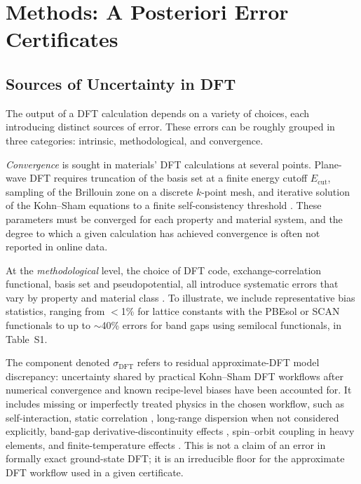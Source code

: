 \documentclass[twocolumn,superscriptaddress,amsmath,amssymb,longbibliography]{revtex4-2}
\newcommand{\Ecut}{E_{\mathrm{cut}}}
\begin{document}
\section{Methods: A Posteriori Error Certificates}
\label{sec:methods}

\subsection{Sources of Uncertainty in DFT}
\label{sec:bg_sources}

The output of a DFT calculation \cite{Hohenberg1964,KohnSham1965} depends on
a variety of choices, each introducing distinct sources of error. These errors can be roughly grouped in three categories: intrinsic, methodological, and convergence.

 \emph{Convergence} is sought in materials' DFT calculations at several points. Plane-wave DFT requires truncation of the
basis set at a finite energy cutoff $\Ecut$, sampling of the Brillouin zone
on a discrete $k$-point mesh, and iterative solution of the Kohn--Sham
equations to a finite self-consistency threshold
\cite{Kresse1996_VASP,Giannozzi2009_QE,Blum2009_FHIaims}. These parameters must be converged for each property and material system,
and the degree to which a given calculation has achieved convergence is often
not reported in online data.

At the \emph{methodological} level, the choice of DFT code, exchange-correlation
functional, basis set and pseudopotential, all introduce systematic errors that vary by property and material class
\cite{Perdew2001_Jacobs_Ladder,Mardirossian2017,Medvedev2017,Sun2015_SCAN,Furness2020_r2SCAN}. To illustrate, we include representative bias statistics, ranging from $<$1\% for
lattice constants with the PBEsol or SCAN functionals to up to  $\sim$40\% errors for band gaps using
semilocal functionals, in Table~S1.

The component denoted $\sigma_{\mathrm{DFT}}$ refers to residual approximate-DFT model discrepancy: uncertainty shared by practical Kohn--Sham DFT workflows after numerical convergence and known recipe-level biases have been accounted for. It includes missing or imperfectly treated physics in the chosen workflow, such as self-interaction, static correlation \cite{Georges1996_DMFT,Anisimov1997}, long-range dispersion when not considered explicitly, band-gap derivative-discontinuity effects \cite{Perdew1983,Sham1983}, spin--orbit coupling in heavy elements, and finite-temperature effects \cite{Cohen2008,Becke2014,Grimme2010_D3,Klimes2012_vdW}. This is not a claim of an error in formally exact ground-state DFT; it is an irreducible floor for the approximate DFT workflow used in a given certificate.
\end{document}
